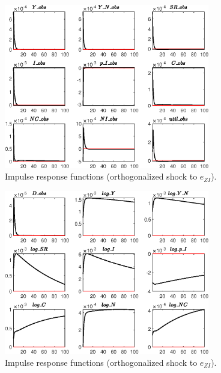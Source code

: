 \begin{figure}[H]
\centering 
\includegraphics[width=0.80\textwidth]{BRS_growth/graphs/BRS_growth_IRF_e_ZI1}
\caption{Impulse response functions (orthogonalized shock to ${e_{ZI}}$).}\label{Fig:IRF:e_ZI:1}
\end{figure}
 
\begin{figure}[H]
\centering 
\includegraphics[width=0.80\textwidth]{BRS_growth/graphs/BRS_growth_IRF_e_ZI2}
\caption{Impulse response functions (orthogonalized shock to ${e_{ZI}}$).}\label{Fig:IRF:e_ZI:2}
\end{figure}
 
